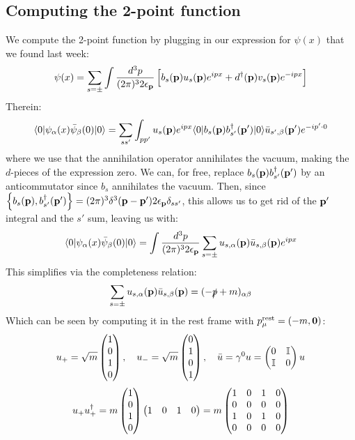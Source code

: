 \subsection{Computing the 2-point function}
We compute the 2-point function by plugging in our expression for $\psi(x)$ that we found last week:
\begin{equation}
    \psi(x) = \sum_{s=\pm}\int \frac{d^3p}{(2\pi)^32\epsilon_{\mathbf{p}}}\left[b_s(\mathbf{p})u_s(\mathbf{p})e^{ipx} + d^\dagger(\mathbf{p})v_s(\mathbf{p})e^{-ipx}\right]
\end{equation}
Therein:
\begin{equation}
    \langle 0 \rvert\psi_\alpha(x)\bar{\psi}_\beta(0)\lvert 0 \rangle = \sum_{ss'}\int_{pp'} u_s(\mathbf{p})e^{ipx}\langle 0 \rvert b_s(\mathbf{p})b_{s'}^\dagger(\mathbf{p}')\lvert 0 \rangle\bar{u}_{s', \beta}(\mathbf{p}')e^{-ip'\cdot 0}
\end{equation}
where we use that the annihilation operator annihilates the vacuum, making the $d$-pieces of the expression zero. We can, for free, replace $b_s(\mathbf{p})b_{s'}^\dagger(\mathbf{p}')$ by an anticommutator since $b_s$ annihilates the vacuum. Then, since $\set{b_s(\ensuremath{\mathbf{p}}), b_{s'}^\dagger(\ensuremath{\mathbf{p}}')} = (2\pi)^3\delta^3(\mathbf{p} - \mathbf{p}')2\epsilon_{\mathbf{p}}\delta_{ss'}$, this allows us to get rid of the $\mathbf{p}'$ integral and the $s'$ sum, leaving us with:
\begin{equation}
    \langle 0 \rvert\psi_\alpha(x)\bar{\psi}_\beta(0)\lvert 0 \rangle = \int \frac{d^3p}{(2\pi)^32\epsilon_{\mathbf{p}}}\sum_{s=\pm}u_{s, \alpha}(\mathbf{p})\bar{u}_{s, \beta}(\mathbf{p}) e^{ipx}
\end{equation}
This simplifies via the completeness relation:
\begin{equation}
    \sum_{s=\pm}u_{s, \alpha}(\mathbf{p})\bar{u}_{s, \beta}(\mathbf{p}) = (-\slashed{p} + m)_{\alpha\beta}
\end{equation}
Which can be seen by computing it in the rest frame with $p_\mu^{\text{rest}} = (-m, \mathbf{0})$:
\begin{equation}
    u_+ = \sqrt{m}\begin{pmatrix}1\\0\\1\\0\end{pmatrix}, \quad  u_- = \sqrt{m}\begin{pmatrix}0\\1\\0\\1\end{pmatrix}, \quad \bar{u} = \gamma^0u = \begin{pmatrix}0 & \mathbb{I} \\ \mathbb{I} & 0\end{pmatrix}u
\end{equation}
\begin{equation}
    u_+u_+^\dagger = m\begin{pmatrix}1\\0\\1\\0\end{pmatrix}\begin{pmatrix}1&0&1&0\end{pmatrix} = m\begin{pmatrix}1 & 0 & 1 & 0 \\ 0 & 0 & 0 & 0 \\ 1 & 0 & 1 & 0 \\ 0 & 0 & 0 & 0\end{pmatrix}
\end{equation}
